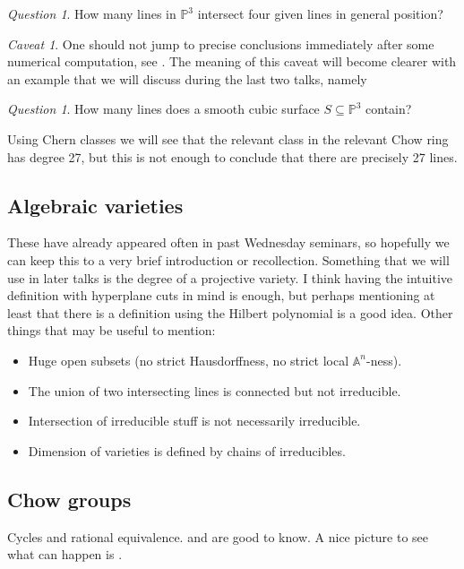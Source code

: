 \documentclass[A4paper, 12pt, british, reqno]{amsart}
\newcommand{\A}{\mathbb{A}} %
\renewcommand{\P}{\mathbb{P}} %
\theoremstyle{plain}
\theoremstyle{definition}
\theoremstyle{remark}
\newtheorem{q}[thm]{Question}
\newtheorem{caveat}[thm]{Caveat}
\theoremstyle{plain}
\theoremstyle{definition}
\theoremstyle{remark}
\theoremstyle{plain}
\theoremstyle{definition}
\theoremstyle{remark}
\begin{document}
\begin{q}\label{q1}
    How many lines in $\P^{3}$ intersect four given lines in general position?
\end{q}

\begin{caveat}\label{caveat1}
    One should not jump to precise conclusions immediately after some numerical computation, see \cite[\S 3.1.2]{eh16}.
    The meaning of this caveat will become clearer with an example that we will discuss during the last two talks, namely
\end{caveat}

\begin{q}\label{q2}
    How many lines does a smooth cubic surface $S\subseteq \P^{3}$ contain?
\end{q}

Using Chern classes we will see that the relevant class in the relevant Chow ring has degree 27, but this is not enough to conclude that there are precisely 27 lines.

\subsection{Algebraic varieties}

These have already appeared often in past Wednesday seminars, so hopefully we can keep this to a very brief introduction or recollection.
Something that we will use in later talks is the degree of a projective variety.
I think having the intuitive definition with hyperplane cuts in mind is enough, but perhaps mentioning at least that there is a definition using the Hilbert polynomial is a good idea.
Other things that may be useful to mention:
\begin{itemize}
    \item Huge open subsets (no strict Hausdorffness, no strict local $\A^{n}$-ness).
    \item The union of two intersecting lines is connected but not irreducible.
    \item Intersection of irreducible stuff is not necessarily irreducible.
    \item Dimension of varieties is defined by chains of irreducibles.
\end{itemize}

\subsection{Chow groups \cite[\S 1.2.1 and 1.2.2]{eh16}}
Cycles and rational equivalence.
\cite[Prop.~1.4]{eh16} and \cite[Prop.~1.10]{eh16} are good to know.
A nice picture to see what can happen is \cite[Fig.~1.2]{eh16}.
\end{document}
